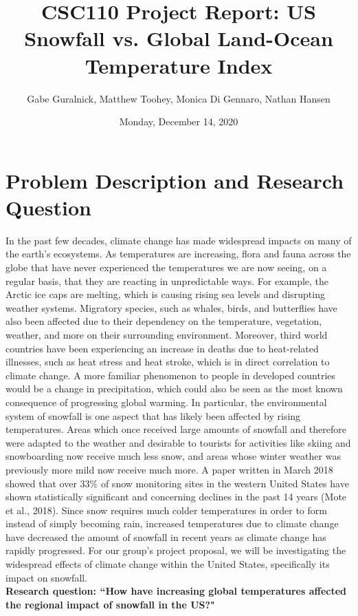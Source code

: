 \documentclass[fontsize=11pt]{article}
\title{CSC110 Project Report: US Snowfall vs. Global Land-Ocean Temperature Index}
\author{Gabe Guralnick, Matthew Toohey, Monica Di Gennaro, Nathan Hansen}
\date{Monday, December 14, 2020}
\begin{document}
\maketitle

\section*{Problem Description and Research Question}

In the past few decades, climate change has made widespread impacts on many of the earth's ecosystems.
As temperatures are increasing, flora and fauna across the globe that have never experienced the temperatures we are now seeing, on a regular basis, that they are reacting in unpredictable ways.
For example, the Arctic ice caps are melting, which is causing rising sea levels and disrupting weather systems. Migratory species, such as whales, birds, and butterflies have also been affected due to their dependency on the temperature, vegetation, weather, and more on their surrounding environment. Moreover, third world countries have been experiencing an increase in deaths due to heat-related illnesses, such as heat stress and heat stroke, which is in direct correlation to climate change. A more familiar phenomenon to people in developed countries would be a change in precipitation, which could also be seen as the most known consequence of progressing global warming. In particular, the environmental system of snowfall is one aspect that has likely been affected by rising temperatures.
Areas which once received large amounts of snowfall and therefore were adapted to the weather and desirable to tourists for activities like skiing and snowboarding now receive much less snow, and areas whose winter weather was previously more mild now receive much more. A paper written in March 2018 showed that over 33\% of snow monitoring sites in the western United States have shown statistically significant and concerning declines in the past 14 years (Mote et al., 2018).
Since snow requires much colder temperatures in order to form instead of simply becoming rain, increased temperatures due to climate change have decreased the amount of snowfall in recent years as climate change has rapidly progressed. For our group's project proposal, we will be investigating the widespread effects of climate change within the United States, specifically its impact on snowfall.\\

\textbf{Research question: ``How have increasing global temperatures affected the regional impact of snowfall in the US?"}
\end{document}

